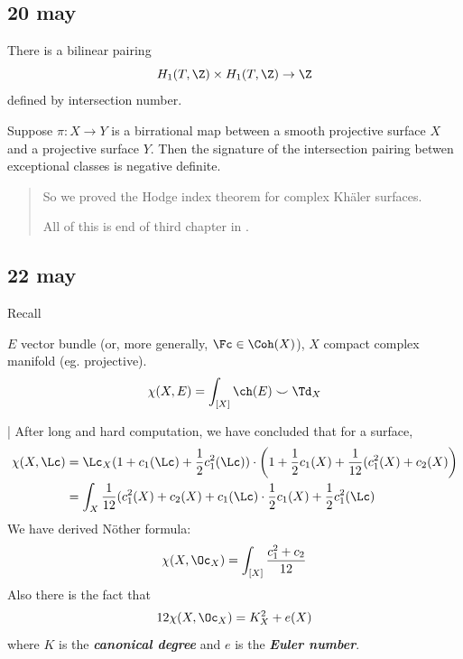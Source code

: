 \subsection{20 may}
There is a bilinear pairing
\[H_1(T,\Z)\times H_1(T,\Z)\to\Z\]
defined by intersection number.

\begin{thm}
	Suppose $\pi:X\to Y$ is a birrational map between a smooth projective surface $X$ and a projective surface $Y$. Then the signature of the intersection pairing betwen exceptional classes is negative definite.
\end{thm}
\begin{quotation}
	So we proved the Hodge index theorem for complex Khäler surfaces.
	
	All of this is end of third chapter in \cite{huybrechts}.
\end{quotation}
\subsection{22 may}
Recall
\begin{thm}
	$E$ vector bundle (or, more generally, $\Fc\in\Coh(X)$), $X$ compact complex manifold (eg. projective).
	\[\chi(X,E)=\int_{[X]}\ch(E)\smile \Td_X\]
\end{thm}|
After long and hard computation, we have concluded that for a surface,
\begin{align*}
	\chi(X,\Lc)&=\Lc_X(1+c_1(\Lc)+\frac{1}{2}c_1^2(\Lc))\cdot\left(1+\frac{1}{2}c_1(X)+\frac{1}{12}(c_1^2(X)+c_2(X)\right)\\
	&=\int_X\frac{1}{12}(c_1^2(X)+c_2(X)+c_1(\Lc)\cdot\frac{1}{2}c_1(X)+\frac{1}{2}c_1^2(\Lc)
\end{align*}
We have derived Nöther formula:
\[\chi(X,\Oc_X)=\int_{[X]}\frac{c_1^2+c_2}{12}\]
Also there is the fact that
\[12\chi(X,\Oc_X)=K_X^2+e(X)\]
where $K$ is the \textbf{\textit{canonical degree}} and $e$ is the \textbf{\textit{Euler number}}.

